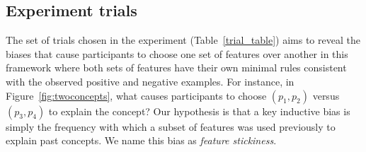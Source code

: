 \subsection{Experiment trials}\label{sec:hypothesis}
    The set of trials chosen in the experiment (Table~\ref{trial_table}) aims to reveal the biases that cause participants to choose one set of features over another in this framework where both sets of features have their own minimal rules consistent with the observed positive and negative examples. For instance, in Figure~\ref{fig:twoconcepts}, what causes participants to choose $(p_1, p_2)$ versus $(p_3, p_4)$ to explain the concept? Our hypothesis is that a key inductive bias is simply the frequency with which a subset of features was used previously to explain past concepts. We name this bias as \textit{feature stickiness}. %


\renewcommand{\arraystretch}{1.4}
\newcommand{\marcaEnTabla}{{\bullet}}%



